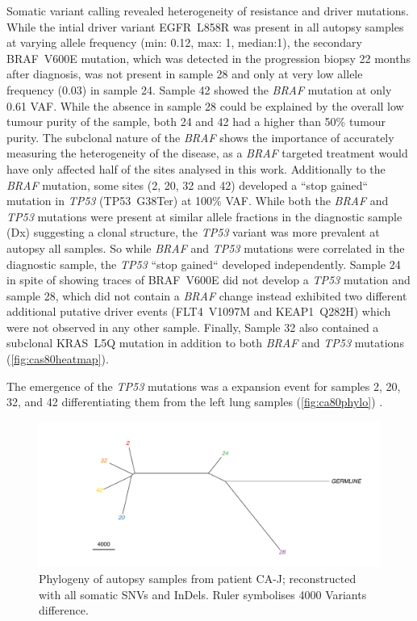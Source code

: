 Somatic variant calling revealed heterogeneity of resistance and driver mutations. While the intial driver variant EGFR~L858R was present in all autopsy samples at varying allele frequency (min: 0.12, max: 1, median:1), the secondary BRAF~V600E mutation, which was detected in the progression biopsy 22 months after diagnosis, was not present in sample 28 and only at very low allele frequency (0.03) in sample 24. Sample 42 showed the \textit{BRAF} mutation at only 0.61 VAF. While the absence in sample 28 could be explained by the overall low tumour purity of the sample, both 24 and 42 had a higher than 50\% tumour purity. The subclonal nature of the \textit{BRAF} shows the importance of accurately measuring the heterogeneity of the disease, as a \textit{BRAF} targeted treatment would have only affected half of the sites analysed in this work. Additionally to the \textit{BRAF} mutation, some sites (2, 20, 32 and 42) developed a ``stop gained`` mutation in \textit{TP53} (TP53~G38Ter) at 100\% VAF. While both the \textit{BRAF} and \textit{TP53} mutations were present at similar allele fractions in the diagnostic sample (Dx) suggesting a clonal structure, the \textit{TP53} variant was more prevalent at autopsy all samples. So while \textit{BRAF} and \textit{TP53} mutations were correlated in the diagnostic sample, the \textit{TP53} ``stop gained`` developed independently.
Sample 24 in spite of showing traces of BRAF~V600E did not develop a \textit{TP53} mutation and sample 28, which did not contain a \textit{BRAF} change instead exhibited two different additional putative driver events (FLT4~V1097M and KEAP1~Q282H) which were not observed in any other sample. 
Finally, Sample 32 also contained a subclonal KRAS~L5Q mutation in addition to both \textit{BRAF} and \textit{TP53} mutations (\autoref{fig:cas80heatmap}). 

The emergence of the \textit{TP53} mutations was a expansion event for samples 2, 20, 32, and 42 differentiating them from the left lung samples (\autoref{fig:ca80phylo})	. 

\begin{figure}[ht]
	\centering
	\includegraphics[width=.99\linewidth]{Figures/CASCADE/CA80/CA80phylo.pdf}
	\caption[Phylogeny of autopsy samples from patient CA-J]{Phylogeny of autopsy samples from patient CA-J; reconstructed with all somatic SNVs and InDels. Ruler symbolises 4000 Variants difference.} \label{fig:ca80phylo}
\end{figure}


